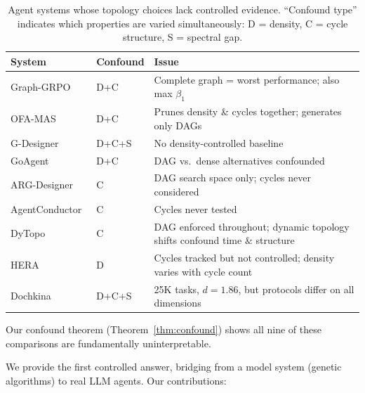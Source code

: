 \documentclass[runningheads]{llncs}
\begin{document}
\begin{table}[t]
\centering
\caption{Agent systems whose topology choices lack controlled
evidence. ``Confound type'' indicates which properties are varied
simultaneously: D = density, C = cycle structure, S = spectral gap.}
\label{tab:evidence-gap}
\footnotesize
\begin{tabular}{@{}llp{4.5cm}@{}}
\toprule
\textbf{System} & \textbf{Confound} & \textbf{Issue} \\
\midrule
Graph-GRPO~\cite{graphgrpo2026} & D+C & Complete graph = worst
  performance; also max $\beta_1$ \\
OFA-MAS~\cite{ofamas2026} & D+C & Prunes density \& cycles together;
  generates only DAGs \\
G-Designer~\cite{gdesigner2025} & D+C+S & No density-controlled
  baseline \\
GoAgent~\cite{goagent2026} & D+C & DAG vs.\ dense alternatives
  confounded \\
ARG-Designer~\cite{argdesigner2026} & C & DAG search space only;
  cycles never considered \\
AgentConductor~\cite{agentconductor2026} & C & Cycles never tested \\
DyTopo~\cite{dytopo2026} & C & DAG enforced throughout; dynamic
  topology shifts confound time \& structure \\
HERA~\cite{hera2026} & D & Cycles tracked but not controlled;
  density varies with cycle count \\
Dochkina~\cite{dochkina2026} & D+C+S & 25K tasks, $d = 1.86$, but
  protocols differ on all dimensions \\
\bottomrule
\end{tabular}
\end{table}

\noindent
Our confound theorem (Theorem~\ref{thm:confound}) shows all nine of
these comparisons are fundamentally uninterpretable.

We provide the first controlled answer, bridging from a model system
(genetic algorithms) to real LLM agents. Our contributions:
\end{document}
